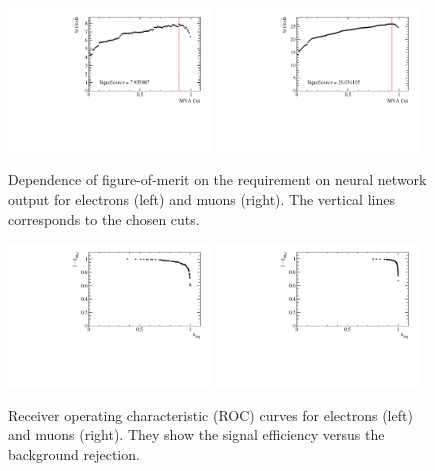 %
\begin{figure}
\centering
\includegraphics[width=0.48\textwidth]{RKst/figs/Training/EE_FoM.pdf}
\includegraphics[width=0.48\textwidth]{RKst/figs/Training/MM_FoM.pdf}
\caption{Dependence of figure-of-merit on the requirement on neural network output
for electrons (left) and muons (right). The vertical lines corresponds to the chosen cuts.}
\label{fig:RKst_FOM}
\end{figure}

\begin{figure}
\centering
\includegraphics[width=0.48\textwidth]{RKst/figs/Training/EE_ROC.pdf}
\includegraphics[width=0.48\textwidth]{RKst/figs/Training/MM_ROC.pdf}
\caption{Receiver operating characteristic (ROC) curves for electrons (left) and muons (right).
They show the signal efficiency versus the background rejection.}
\label{fig:RKst_ROC}
\end{figure}



